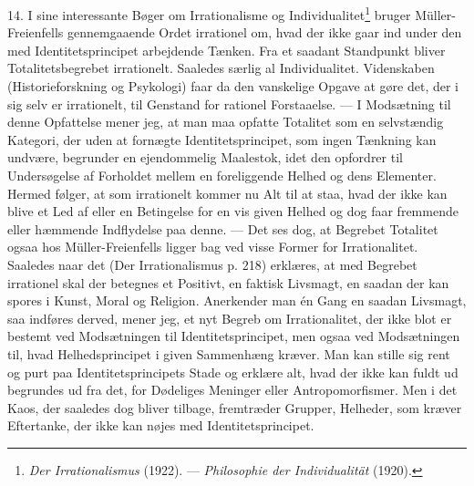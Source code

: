 \documentclass[12pt]{article}
\newcommand{\opage}[1]{\marginnote{\footnotesize\textit{[#1]}}}
\begin{document}
14. I sine interessante Bøger om Irrationalisme og
Individualitet\footnote{\textit{Der Irrationalismus} (1922). ---
\textit{Philosophie der Individualität} (1920).} bruger
Müller-Freienfells gennemgaaende Ordet irrationel om, hvad der ikke
gaar ind under den med Identitetsprincipet arbejdende Tænken. Fra et
saadant Standpunkt bliver Totalitetsbegrebet irrationelt. Saaledes
særlig al Individualitet. Videnskaben (Historieforskning og Psykologi)
faar da den vanskelige Opgave at gøre det, der i sig selv er
irrationelt, til Genstand for rationel Forstaaelse. --- I Modsætning
til denne Opfattelse mener jeg, at man maa opfatte Totalitet som en
selvstændig Kategori, der uden at fornægte Identitetsprincipet, som
ingen Tænkning kan undvære, begrunder en ejendommelig Maalestok, idet
den opfordrer til Undersøgelse af Forholdet mellem en foreliggende
Helhed og dens Elementer. Hermed følger, at som irrationelt kommer nu
Alt til at staa, hvad der ikke kan blive et Led af eller en Betingelse
for en vis given Helhed og dog faar fremmende eller hæmmende
Indflydelse paa denne. --- Det ses dog, at Begrebet Totalitet ogsaa
hos Müller-Freienfells ligger bag ved visse Former for Irrationalitet.
Saaledes naar det (Der Irrationalismus p. 218) erklæres, at
\guillemotright{}med Begrebet irrationel\guillemotleft{} skal der betegnes
\guillemotright{}et Positivt, en faktisk Livsmagt\guillemotleft{}, en saadan
der kan spores i Kunst, Moral og Religion. Anerkender man én Gang en
saadan Livsmagt,
\setcounter{footnote}{0}%
\opage{45}saa indføres derved, mener jeg, et nyt Begreb om
Irrationalitet, der ikke blot er bestemt ved Modsætningen til
Identitetsprincipet, men ogsaa ved Modsætningen til, hvad
Helhedsprincipet i given Sammenhæng kræver. Man kan stille sig rent og
purt paa Identitetsprincipets Stade og erklære alt, hvad der ikke kan
fuldt ud begrundes ud fra det, for \guillemotright{}Dødeliges
Meninger\guillemotleft{} eller \guillemotright{}Antropomorfismer\guillemotleft{}.
Men i det Kaos, der saaledes dog bliver tilbage, fremtræder Grupper,
Helheder, som kræver Eftertanke, der ikke kan nøjes med
Identitetsprincipet.
\end{document}
